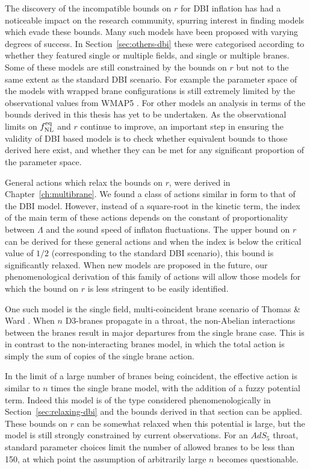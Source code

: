 The discovery of the incompatible bounds on $r$ for DBI inflation has had a noticeable
impact on the research community, spurring interest in finding models which evade
these bounds. Many such models have been proposed with varying degrees of success. In
Section~\ref{sec:others-dbi} these were categorised according to whether they
featured single or multiple fields, and single or multiple branes. Some of these models are still
constrained by the bounds on $r$ but not to the same extent as the standard DBI scenario. For
example the parameter space of the models with wrapped brane configurations is still extremely
limited by the observational values from WMAP5 \cite{Alabidi:2008ej}. For other models an analysis
in terms of the bounds derived in this thesis has yet to be undertaken. As the observational limits
on $f_{\mathrm{NL}}^{\mathrm{eq}}$ and $r$ continue to improve, an important step in ensuring the validity of DBI based
models is to check whether equivalent bounds to those derived here exist, and whether they can be
met for any significant proportion of the parameter space.

General actions which relax the bounds on $r$, were derived in
Chapter~\ref{ch:multibrane}. 
We found a class of actions similar in form to that of the DBI model. 
However, instead of a square-root in the kinetic term, the index of the main term of these
actions depends on the constant of proportionality between $\Lambda$ and the sound
speed of inflaton fluctuations.
The upper bound on $r$ can be derived for these general actions and when the index
is below the critical value of $1/2$ (corresponding to the standard DBI scenario), this bound is
significantly relaxed.  
When new models are proposed in the future, our phenomenological derivation of this family of
actions will allow those models for which the bound on $r$ is less stringent to be easily
identified.

One such model is the single field, multi-coincident brane scenario of
Thomas \& Ward \cite{thomasward}. When $n$ D3-branes propagate in a throat, the
non-Abelian interactions between the branes result in major departures from the
single brane case. This is in contrast to the non-interacting branes model, in which
the total action is simply the sum of copies of the single brane action.

In the limit of a large number of branes being coincident, the effective action is
similar to $n$ times the single brane model, with the addition of a fuzzy potential
term. 
% 
Indeed this model is of the type considered phenomenologically in Section~\ref{sec:relaxing-dbi} and
the bounds derived in that section can be applied. 
% 
These bounds on $r$ can be somewhat relaxed when this potential is large,
but the model is still strongly constrained by current observations. For an $AdS_5$
throat, standard parameter choices limit the number of allowed branes to be
less than 150, at which point the assumption of arbitrarily large $n$ becomes
questionable.

